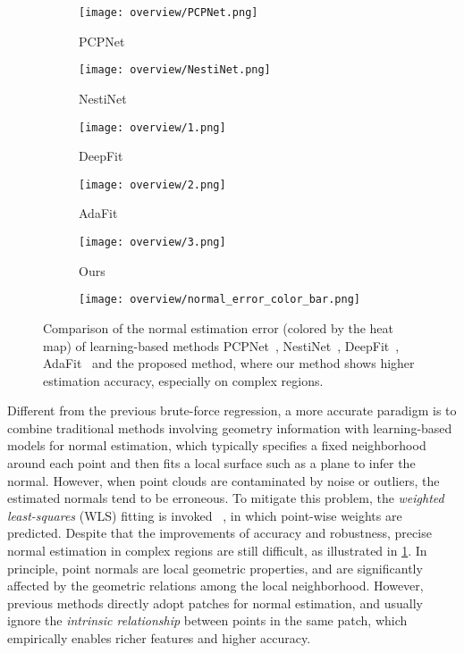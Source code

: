 \documentclass[runningheads]{llncs}
\begin{document}
\begin{figure}[t]
  \centering
    \begin{subfigure}{0.17\linewidth}
    \texttt{[image: overview/PCPNet.png]}
    \caption{PCPNet}
  \end{subfigure}
      \begin{subfigure}{0.17\linewidth}
    \texttt{[image: overview/NestiNet.png]}
    \caption{NestiNet}
  \end{subfigure}
  \begin{subfigure}{0.17\linewidth}
    \texttt{[image: overview/1.png]}
    \caption{DeepFit}
  \end{subfigure}
  \begin{subfigure}{0.17\linewidth}
    \texttt{[image: overview/2.png]}
    \caption{AdaFit}
  \end{subfigure}
  \begin{subfigure}{0.17\linewidth}
    \texttt{[image: overview/3.png]}
    \caption{Ours}
  \end{subfigure}
    \begin{subfigure}{0.09\linewidth}
\texttt{[image: overview/normal\_error\_color\_bar.png]}
\end{subfigure}
 \caption{Comparison of the normal estimation error (colored by the heat map) of learning-based methods PCPNet~\cite{guerrero2018pcpnet}, NestiNet~\cite{ben2019nesti}, DeepFit~\cite{ben2020deepfit}, AdaFit~\cite{zhu2021adafit} and the proposed method, where our method shows higher estimation accuracy, especially on complex regions.}
   \label{fig:overview}
\end{figure}

Different from the previous brute-force regression, a more accurate paradigm is to combine traditional methods involving geometry information with learning-based models for normal estimation, which typically specifies a fixed neighborhood around each point and then fits a local surface such as a plane to infer the normal. However, when point clouds are contaminated by noise or outliers, the estimated normals tend to be erroneous. To mitigate this problem, the \emph{weighted least-squares} (WLS) fitting is invoked ~\cite{lenssen2020deep,ben2020deepfit,zhang2022geometry,zhu2021adafit}, in which point-wise weights are predicted. Despite that the improvements of accuracy and robustness, precise normal estimation in complex regions are still difficult, as illustrated in \cref{fig:overview}. In principle, point normals are local geometric properties, and are significantly affected by the  geometric relations among the local neighborhood. However, previous methods 
directly adopt patches for normal estimation, and usually ignore the \emph{intrinsic relationship} between points in the same patch, which empirically enables richer features and higher accuracy.
\end{document}
